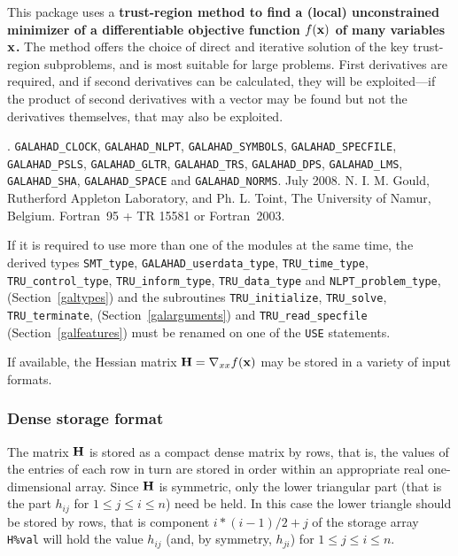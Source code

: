 \documentclass{galahad}
\newcommand{\packagename}{TRU}
\newcommand{\fullpackagename}{\libraryname\_\packagename}
\begin{document}
\galheader


\galsummary
This package uses a {\bf trust-region method to find a (local)
unconstrained minimizer of a differentiable objective function $f({\mathbf{x}})$
of many variables ${\mathbf{x}}$.} The method offers the choice of direct
and iterative solution of the key trust-region subproblems, and
is most suitable for large problems. First derivatives are required,
and if second derivatives can be calculated, they will be exploited---if
the product of second derivatives with a vector may be found but
not the derivatives themselves, that may also be exploited.


\galattributes
\galversions{\tt  \fullpackagename\_single, \fullpackagename\_double}.
\galuses
{\tt GALAHAD\_CLOCK},
{\tt GALAHAD\_NLPT},
{\tt GALAHAD\_SY\-M\-BOLS},
{\tt GALAHAD\_SPECFILE},
{\tt GALAHAD\_PSLS},
{\tt GALAHAD\_GLTR},
{\tt GALAHAD\_TRS},
{\tt GALAHAD\_DPS},
{\tt GALAHAD\_LMS},
{\tt GALAHAD\_SHA},
{\tt GALAHAD\_SPACE} and
{\tt GALAHAD\_NORMS}.
\galdate July 2008.
\galorigin N. I. M. Gould, Rutherford Appleton Laboratory,
and Ph. L. Toint, The University of Namur, Belgium.
\gallanguage Fortran~95 + TR 15581 or Fortran~2003.


\galhowto



\noindent
If it is required to use more than one of the modules at the same time, 
the derived types
{\tt SMT\_type},
{\tt GALAHAD\_userdata\_type},
{\tt \packagename\_time\_\-type},
{\tt \packagename\_control\_type},
{\tt \packagename\_inform\_type},
{\tt \packagename\_data\_type}
and
{\tt NLPT\_problem\_type},
(Section~\ref{galtypes})
and the subroutines
{\tt \packagename\_initialize},
{\tt \packagename\_\-solve},
{\tt \packagename\_terminate},
(Section~\ref{galarguments})
and
{\tt \packagename\_read\_specfile}
(Section~\ref{galfeatures})
must be renamed on one of the {\tt USE} statements.


\galmatrix
If available, the Hessian matrix ${\mathbf{H}} = \nabla_{xx} f({\mathbf{x}})$
may be stored in a variety of input formats.

\subsubsection{Dense storage format}\label{dense}
The matrix ${\mathbf{H}}$ is stored as a compact
dense matrix by rows, that is, the values of the entries of each row in turn are
stored in order within an appropriate real one-dimensional array.
Since ${\mathbf{H}}$ is symmetric, only the lower triangular part (that is the part
$h_{ij}$ for $1 \leq j \leq i \leq n$) need be held. In this case
the lower triangle should be stored by rows, that is
component $i \ast (i-1)/2 + j$ of the storage array {\tt H\%val}
will hold the value $h_{ij}$ (and, by symmetry, $h_{ji}$)
for $1 \leq j \leq i \leq n$.
\end{document}

